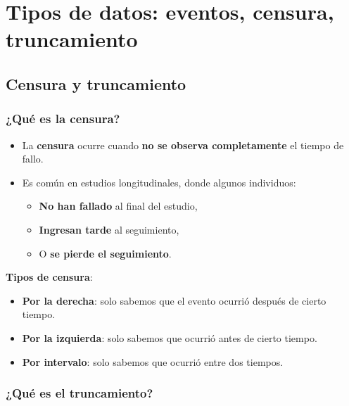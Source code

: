 \documentclass[
  letterpaper,
  DIV=11,
  numbers=noendperiod]{scrartcl}
\providecommand{\tightlist}{%
  \setlength{\itemsep}{0pt}\setlength{\parskip}{0pt}}
\begin{document}
\section{Tipos de datos: eventos, censura,
truncamiento}\label{tipos-de-datos-eventos-censura-truncamiento}

\subsection{Censura y truncamiento}\label{sec-censura-y-truncamiento}

\subsubsection{\texorpdfstring{¿Qué es la
\textbf{censura}?}{¿Qué es la censura?}}\label{quuxe9-es-la-censura}

\begin{itemize}
\tightlist
\item
  La \textbf{censura} ocurre cuando \textbf{no se observa completamente}
  el tiempo de fallo.
\item
  Es común en estudios longitudinales, donde algunos individuos:

  \begin{itemize}
  \tightlist
  \item
    \textbf{No han fallado} al final del estudio,
  \item
    \textbf{Ingresan tarde} al seguimiento,
  \item
    O \textbf{se pierde el seguimiento}.
  \end{itemize}
\end{itemize}

\textbf{Tipos de censura}:

\begin{itemize}
\tightlist
\item
  \textbf{Por la derecha}: solo sabemos que el evento ocurrió después de
  cierto tiempo.
\item
  \textbf{Por la izquierda}: solo sabemos que ocurrió antes de cierto
  tiempo.
\item
  \textbf{Por intervalo}: solo sabemos que ocurrió entre dos tiempos.
\end{itemize}

\subsubsection{\texorpdfstring{¿Qué es el
\textbf{truncamiento}?}{¿Qué es el truncamiento?}}\label{quuxe9-es-el-truncamiento}
\end{document}

